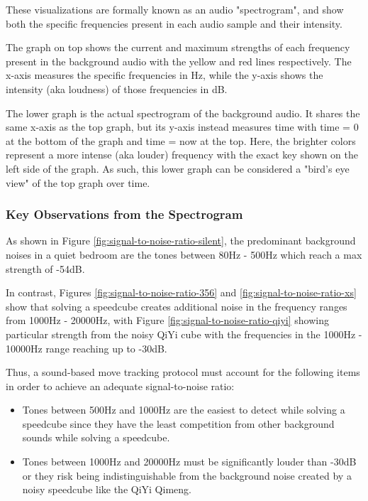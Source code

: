 These visualizations are formally known as an audio "spectrogram", and
show both the specific frequencies present in each audio sample and
their intensity.

The graph on top shows the current and maximum strengths of each
frequency present in the background audio with the yellow and red lines
respectively. The x-axis measures the specific frequencies in Hz, while
the y-axis shows the intensity (aka loudness) of those frequencies in
dB.

The lower graph is the actual spectrogram of the background audio. It
shares the same x-axis as the top graph, but its y-axis instead
measures time with time = 0 at the bottom of the graph and time = now
at the top. Here, the brighter colors represent a more intense (aka
louder) frequency with the exact key shown on the left side of the
graph. As such, this lower graph can be considered a "bird's eye view"
of the top graph over time.

\subsubsection{Key Observations from the Spectrogram}
\label{subsubsec:key-observations-from-the-spectrogram}

As shown in Figure \ref{fig:signal-to-noise-ratio-silent}, the
predominant background noises in a quiet bedroom are the tones between
80Hz - 500Hz which reach a max strength of -54dB.

In contrast, Figures \ref{fig:signal-to-noise-ratio-356} and
\ref{fig:signal-to-noise-ratio-xs} show that solving a speedcube
creates additional noise in the frequency ranges from 1000Hz - 20000Hz,
with Figure \ref{fig:signal-to-noise-ratio-qiyi} showing particular
strength from the noisy QiYi cube with the frequencies in the 1000Hz -
10000Hz range reaching up to -30dB.

Thus, a sound-based move tracking protocol must account for the
following items in order to achieve an adequate signal-to-noise ratio:

\begin{itemize}
    \item Tones between 500Hz and 1000Hz are the easiest to detect while solving a speedcube since they have the least competition from other background sounds while solving a speedcube.
    \item Tones between 1000Hz and 20000Hz must be significantly louder than -30dB or they risk being indistinguishable from the background noise created by a noisy speedcube like the QiYi Qimeng.
\end{itemize}

